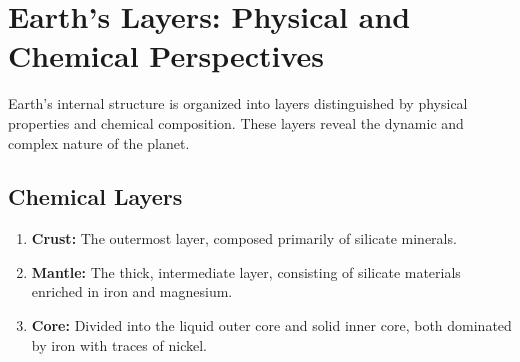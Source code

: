 \documentclass{article}
\begin{document}
\section*{Earth's Layers: Physical and Chemical Perspectives}

Earth's internal structure is organized into layers distinguished by physical properties and chemical composition. These layers reveal the dynamic and complex nature of the planet.

\subsection*{Chemical Layers}
\begin{enumerate}
    \item \textbf{Crust:} The outermost layer, composed primarily of silicate minerals.
    \item \textbf{Mantle:} The thick, intermediate layer, consisting of silicate materials enriched in iron and magnesium.
    \item \textbf{Core:} Divided into the liquid outer core and solid inner core, both dominated by iron with traces of nickel.
\end{enumerate}
\end{document}
